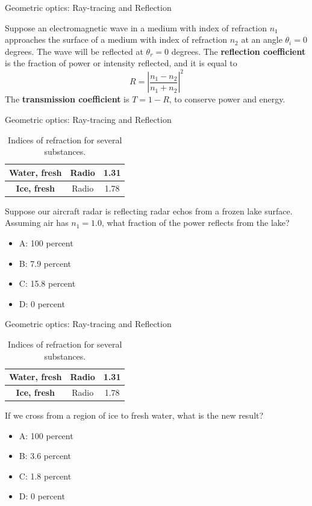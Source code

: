 \documentclass{beamer}
\begin{document}
\begin{frame}{Geometric optics: Ray-tracing and Reflection}
\begin{tcolorbox}[colback=white,colframe=black!40!black,title=Reflection Coefficient at Normal Incidence]
\alert{Suppose an electromagnetic wave in a medium with index of refraction $n_1$ approaches the surface of a medium with index of refraction $n_2$ at an angle $\theta_i = 0$ degrees.  The wave will be reflected at $\theta_r = 0$ degrees.  The \textbf{reflection coefficient} is the fraction of power or intensity reflected, and it is equal to
\begin{equation}
R = \left| \frac{n_1 - n_2}{n_1 + n_2}\right|^2
\end{equation}
The \textbf{transmission coefficient} is $T = 1 - R$, to conserve power and energy.
}
\end{tcolorbox}
\end{frame}

\begin{frame}{Geometric optics: Ray-tracing and Reflection}
\begin{table}
\footnotesize
\centering
\begin{tabular}{| c | c | c |}
\hline
\textbf{Water, fresh} & Radio & 1.31 \\ \hline
\textbf{Ice, fresh} & Radio & 1.78 \\ \hline
\end{tabular}
\caption{\label{tab:n3} \footnotesize Indices of refraction for several substances.}
\end{table}
Suppose our aircraft radar is reflecting radar echos from a frozen lake surface.  Assuming air has $n_1 = 1.0$, what fraction of the power reflects from the lake?
\begin{itemize}
\item A: 100 percent
\item B: 7.9 percent
\item C: 15.8 percent
\item D: 0 percent
\end{itemize}
\end{frame}

\begin{frame}{Geometric optics: Ray-tracing and Reflection}
\begin{table}
\footnotesize
\centering
\begin{tabular}{| c | c | c |}
\hline
\textbf{Water, fresh} & Radio & 1.31 \\ \hline
\textbf{Ice, fresh} & Radio & 1.78 \\ \hline
\end{tabular}
\caption{\label{tab:n4} \footnotesize Indices of refraction for several substances.}
\end{table}
If we cross from a region of ice to fresh water, what is the new result?
\begin{itemize}
\item A: 100 percent
\item B: 3.6 percent
\item C: 1.8 percent
\item D: 0 percent
\end{itemize}
\end{frame}
\end{document}
